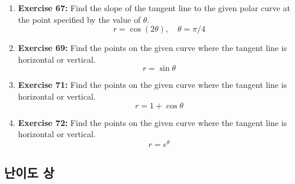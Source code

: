 \documentclass[12pt, a4paper]{article}
\begin{document}
\begin{enumerate}
    \item \textbf{Exercise 67:} Find the slope of the tangent line to the given polar curve at the point specified by the value of $\theta$.
    \[ r = \cos(2\theta), \quad \theta = \pi/4 \]

    \item \textbf{Exercise 69:} Find the points on the given curve where the tangent line is horizontal or vertical.
    \[ r = \sin\theta \]

    \item \textbf{Exercise 71:} Find the points on the given curve where the tangent line is horizontal or vertical.
    \[ r = 1 + \cos\theta \]
    
    \item \textbf{Exercise 72:} Find the points on the given curve where the tangent line is horizontal or vertical.
    \[ r = e^\theta \]
\end{enumerate}

\hrulefill
\vspace{1em}

\subsection*{난이도 상}
\end{document}
